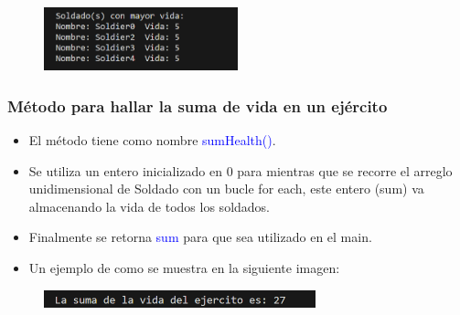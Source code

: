 \documentclass{article}
\begin{document}
        \begin{figure}[H]
            \centering
            \includegraphics[width=0.5\textwidth,keepaspectratio]{img/moreHealth.png}
            \caption{}
        \end{figure}
        
        \newpage
        \subsubsection{Método para hallar la suma de vida en un ejército}

        \begin{itemize}
            \item El método tiene como nombre \textcolor{blue}{sumHealth()}.
            \item Se utiliza un entero inicializado en 0 para mientras que se recorre el arreglo unidimensional de Soldado con un bucle for each, este entero (sum) va almacenando la vida de todos los soldados.
            \item Finalmente se retorna \textcolor{blue}{sum} para que sea utilizado en el main.
        \end{itemize}

        

        \begin{itemize}
            \begin{itemize}
                \item Un ejemplo de como se muestra en la siguiente imagen:
            \end{itemize}
        \end{itemize}

        \begin{figure}[H]
            \centering
            \includegraphics[width=0.7\textwidth,keepaspectratio]{img/sumHealth.png}
            \caption{}
        \end{figure}
        
        
\end{document}
